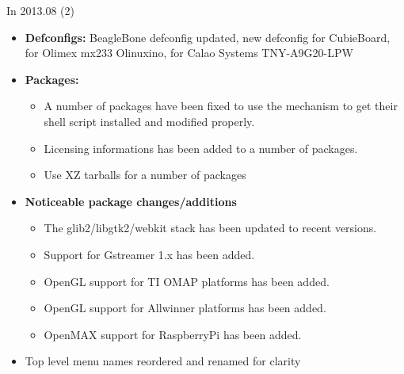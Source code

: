 \begin{frame}{In 2013.08 (2)}
  \begin{itemize}
  \item {\bf Defconfigs:} BeagleBone defconfig updated, new defconfig
    for CubieBoard, for Olimex mx233 Olinuxino, for Calao Systems
    TNY-A9G20-LPW
  \item {\bf Packages:}
    \begin{itemize}
    \item A number of packages have been fixed to use the
       mechanism to get their
       shell script installed and modified
      properly.
    \item Licensing informations has been added to a number of
      packages.
    \item Use XZ tarballs for a number of packages
    \end{itemize}
  \item {\bf Noticeable package changes/additions}
    \begin{itemize}
    \item The glib2/libgtk2/webkit stack has been updated to recent versions.
    \item Support for Gstreamer 1.x has been added.
    \item OpenGL support for TI OMAP platforms has been added.
    \item OpenGL support for Allwinner platforms has been added.
    \item OpenMAX support for RaspberryPi has been added.
    \end{itemize}
  \item Top level menu names reordered and renamed for clarity
  \end{itemize}
\end{frame}

